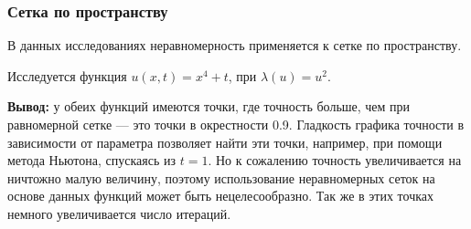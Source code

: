 \newcommand{\graphgridtime}[1]{
\noindent\begin{tikzpicture}
\begin{semilogyaxis}[xlabel=t,ylabel=Точность решения,width=\textwidth, height=6cm]
\addplot[red, no markers] table [skip first n=1, y=r1, x=t]{#1.txt};
\addplot[blue, no markers] table [skip first n=1, y=r2, x=t]{#1.txt};
\addplot[green, no markers] table [skip first n=1, y=r3, x=t]{#1.txt};
\addplot[orange, no markers] table [skip first n=1, y=r4, x=t]{#1.txt};
\addplot[black, no markers] table [skip first n=1, y=ru, x=t]{#1.txt};
\legend{$m_{1, t}$,$m_{2, t}$,$m_{3, t}$,$m_{4, t}$,$x$}
\end{semilogyaxis}
\end{tikzpicture}

\noindent\begin{tikzpicture}
\begin{semilogyaxis}[xlabel=t,ylabel=Число итераций,width=\textwidth, height=6cm]
\addplot[red, no markers] table [skip first n=1, y=i1, x=t]{#1.txt};
\addplot[blue, no markers] table [skip first n=1, y=i2, x=t]{#1.txt};
\addplot[green, no markers] table [skip first n=1, y=i3, x=t]{#1.txt};
\addplot[orange, no markers] table [skip first n=1, y=i4, x=t]{#1.txt};
\addplot[black, no markers] table [skip first n=1, y=iu, x=t]{#1.txt};
\legend{$m_{1, t}$,$m_{2, t}$,$m_{3, t}$,$m_{4, t}$,$x$}
\end{semilogyaxis}
\end{tikzpicture}
}

\subsubsection{Сетка по пространству}

В данных исследованиях неравномерность применяется к сетке по пространству.


Исследуется функция $u(x, t) = x^4 + t$, при $\lambda(u) = u^2$.


\textbf{Вывод:} у обеих функций имеются точки, где точность больше, чем при равномерной сетке --- это точки в окрестности 0.9. Гладкость графика точности в зависимости от параметра позволяет найти эти точки, например, при помощи метода Ньютона, спускаясь из $t=1$. Но к сожалению точность увеличивается на ничтожно малую величину, поэтому использование неравномерных сеток на основе данных функций может быть нецелесообразно. Так же в этих точках немного увеличивается число итераций.

